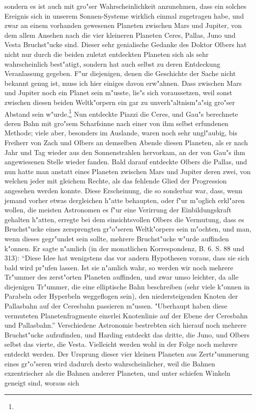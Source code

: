 \documentclass[a4paper, 11pt, oneside, polutonikogreek, german]{article}
\begin{document}
sondern es ist auch mit gro"ser Wahrscheinlichkeit anzunehmen, dass ein solches Ereignis sich in unserem Sonnen-Systeme wirklich einmal zugetragen habe, und zwar an einem vorhanden gewesenen Planeten zwischen Mars und Jupiter, von dem allem Ansehen nach die vier kleineren Planeten Ceres, Pallas, Juno und Vesta Bruchst"ucke sind. Dieser sehr genialische Gedanke des Doktor Olbers hat nicht nur durch die beiden zuletzt entdeckten Planeten sich als sehr wahrscheinlich best"atigt, sondern hat auch selbst zu deren Entdeckung Veranlassung gegeben. F"ur diejenigen, denen die Geschichte der Sache nicht bekannt genug ist, muss ich hier einiges davon erw"ahnen. Dass zwischen Mars und Jupiter noch ein Planet sein m"usste, lie"s sich voraussetzen, weil sonst zwischen diesen beiden Weltk"orpern ein gar zu unverh"altnism"a"sig gro"ser Abstand sein w"urde.\footnote{} Nun entdeckte Piazzi die Ceres, und Gau"s berechnete deren Bahn mit gro"sem Scharfsinne nach einer von ihm selbst erfundenen Methode; viele aber, besonders im Auslande, waren noch sehr ungl"aubig, bis Freiherr von Zach und Olbers an demselben Abende diesen Planeten, als er nach Jahr und Tag wieder aus den Sonnenstrahlen hervorkam, an der von Gau"s ihm angewiesenen Stelle wieder fanden. Bald darauf entdeckte Olbers die Pallas, und nun hatte man anstatt eines Planeten zwischen Mars und Jupiter deren zwei, von welchen jeder mit gleichem Rechte, als das fehlende Glied der Progression angesehen werden konnte. Diese Erscheinung, die so sonderbar war, dass, wenn jemand vorher etwas dergleichen h"atte behaupten, oder f"ur m"oglich erkl"aren wollen, die meisten Astronomen es f"ur eine Verirrung der Einbildungskraft gehalten h"atten, erregte bei dem einsichtsvollen Olbers die Vermutung, dass es Bruchst"ucke eines zersprengten gr"o"seren Weltk"orpers sein m"ochten, und man, wenn dieses gegr"undet sein sollte, mehrere Bruchst"ucke w"urde auffinden k"onnen. Er sagte n"amlich (in der monatlichen Korrespondenz, B. 6. S. 88 und 313): "`Diese Idee hat wenigstens das vor andern Hypothesen voraus, dass sie sich bald wird pr"ufen lassen. Ist sie n"amlich wahr, so werden wir noch mehrere Tr"ummer des zerst"orten Planeten auffinden, und zwar umso leichter, da alle diejenigen Tr"ummer, die eine elliptische Bahn beschreiben (sehr viele k"onnen in Parabeln oder Hyperbeln weggeflogen sein), den niedersteigenden Knoten der Pallasbahn auf der Ceresbahn passieren m"ussen. "Uberhaupt haben diese vermuteten Planetenfragmente einerlei Knotenlinie auf der Ebene der Ceresbahn und Pallasbahn."' Verschiedene Astronomie bestrebten sich hierauf noch mehrere Bruchst"ucke aufzufinden, und Harding entdeckt das dritte, die Juno, und Olbers selbst das vierte, die Vesta. Vielleicht werden wohl in der Folge noch mehrere entdeckt werden. Der Ursprung dieser vier kleinen Planeten aus Zertr"ummerung eines gr"o"seren wird dadurch desto wahrscheinlicher, weil die Bahnen exzentrischer als die Bahnen anderer Planeten, und unter schiefen Winkeln geneigt sind, woraus sich 
\end{document}
